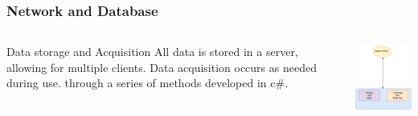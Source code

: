 \documentclass{beamer}
\begin{document}
\begin{frame}
    \frametitle{Network and Database}

    \begin{columns}
        \begin{column}{0.48\textwidth}
            \begin{block}{Data storage and Acquisition}
                All data is stored in a server, allowing for multiple clients. Data acquisition occurs as needed during use. through a series of methods developed in c#.
            \end{block}
        \end{column}
        \begin{column}{0.48\textwidth}
            \includegraphics[width=5cm]{Simple Diagram.png}
        \end{column}
    \end{columns}

\end{frame}
\end{document}
